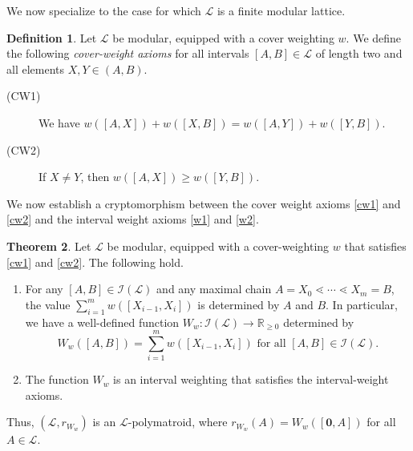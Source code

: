 \documentclass[a4paper,11pt,reqno]{article}
\makeatletter
\def\namedlabel#1#2{\begingroup
    #2%
    \def\@currentlabel{#2}%
    \phantomsection\label{#1}\endgroup
}
\theoremstyle{definition}
\newtheorem{theorem}{Theorem}[section]
\newtheorem{definition}[theorem]{{{Definition}}}
\newcommand{\mL}{\mathcal{L}}
\newcommand{\I}{\mathcal{I}}
\newcommand{\zero}{{\mathbf{0}}}
\makeatother
\begin{document}
We now specialize to the case for which $\mL$ is a finite modular lattice.

\begin{definition}
Let $\mL$ be modular, equipped with a cover weighting $w$. We define the following {\em cover-weight axioms} for all intervals $[A,B]\in\mathcal{L}$ of length two and all elements $X,Y\in(A,B)$.
    \begin{description}
        \item[\namedlabel{cw1}{{\rm (CW1)}}] We have $w([A,X])+w([X,B])=w([A,Y])+w([Y,B])$.
        \item[\namedlabel{cw2}{{\rm (CW2)}}] If $X\neq Y$, then $w([A,X])\geq w([Y,B])$.
    \end{description}
\end{definition}


We now establish a cryptomorphism between the cover weight axioms  \ref{cw1} and \ref{cw2} and the interval weight axioms \ref{w1} and \ref{w2}.

\begin{theorem}\label{th:covwt}
    Let $\mL$ be modular, equipped with a cover-weighting $w$ that satisfies \ref{cw1} and \ref{cw2}. 
    The following hold.
    \begin{enumerate}
        \item %
        For any $[A,B] \in \I(\mL)$ and any maximal chain $A=X_0\lessdot\cdots\lessdot X_m=B$, the value 
        $\sum_{i=1}^mw([X_{i-1},X_i])$ is determined by $A$ and $B$. In particular,
        we have a well-defined function $W_w: \I(\mL) \longrightarrow \mathbb{R}_{\geq 0}$ determined by
        \[ 
           W_w([A,B])=\sum_{i=1}^mw([X_{i-1},X_i]) \text{ for all } [A,B] \in \I(\mL).
        \]
        \item The function $W_w$ is an interval weighting that satisfies the interval-weight axioms.
    \end{enumerate}
    Thus, $(\mL,r_{W_w})$ is an $\mL$-polymatroid, where $r_{W_w}(A)=W_w([\zero,A])$ for all $A \in \mL$.
\end{theorem}%
    
\end{document}
